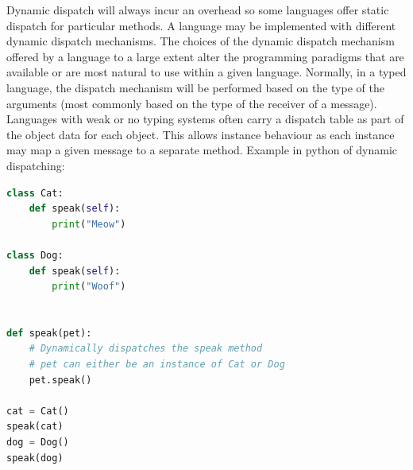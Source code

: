 \documentclass[a4paper,twoside]{article}
\numberwithin{equation}{section}
\begin{document}
Dynamic dispatch will always incur an overhead so some languages offer static dispatch for particular
methods. A language may be implemented with different dynamic dispatch mechanisms.
The choices of the dynamic dispatch mechanism offered by a language to a large extent
alter the programming paradigms that are available or are most natural to use within a given language.
Normally, in a typed language, the dispatch mechanism will be performed based on the type of the
arguments (most commonly based on the type of the receiver of a message). Languages with weak or no
typing systems often carry a dispatch table as part of the object data for each object.
This allows instance behaviour as each instance may map a given message to a separate method.
Example in python of dynamic dispatching:
\begin{lstlisting}[language=Python]
class Cat:
    def speak(self):
        print("Meow")

class Dog:
    def speak(self):
        print("Woof")


def speak(pet):
    # Dynamically dispatches the speak method
    # pet can either be an instance of Cat or Dog
    pet.speak()

cat = Cat()
speak(cat)
dog = Dog()
speak(dog)
\end{lstlisting}
\end{document}
